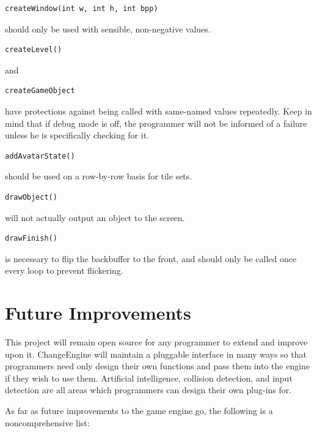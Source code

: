 \documentclass[12pt]{article}
\begin{document}
\begin{verbatim}createWindow(int w, int h, int bpp)\end{verbatim} should only be used with sensible, non-negative values.
\\

\begin{verbatim}createLevel()\end{verbatim} and \begin{verbatim}createGameObject\end{verbatim} have protections against being called with same-named values repeatedly. Keep in mind that if debug mode is off, the programmer will not be informed of a failure unless he is specifically checking for it.
\\

\begin{verbatim}addAvatarState()\end{verbatim} should be used on a row-by-row basis for tile sets.
\\

\begin{verbatim}drawObject()\end{verbatim} will not actually output an object to the screen.
\\

\begin{verbatim}drawFinish()\end{verbatim} is necessary to flip the backbuffer to the front, and should only be called once every loop to prevent flickering.

  \section{Future Improvements}
    This project will remain open source for any programmer to extend and improve upon it. ChangeEngine will maintain a pluggable interface in many ways so that programmers need only design their own functions and pass them into the engine if they wish to use them. Artificial intelligence, collision detection, and input detection are all areas which programmers can design their own plug-ins for.

As far as future improvements to the game engine go, the following is a noncomprehensive list:
\end{document}
